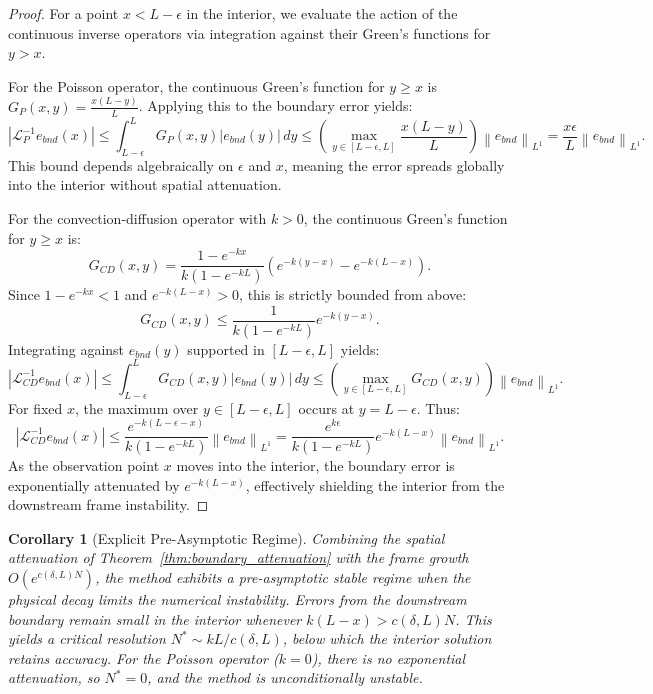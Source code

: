 \documentclass[pdflatex,sn-mathphys-num]{sn-jnl}%
\theoremstyle{thmstyleone}%
\newtheorem{corollary}{Corollary}
\newcommand{\norm}[1]{\left\lVert#1\right\rVert}
\begin{document}
\begin{proof}
For a point $x < L-\epsilon$ in the interior, we evaluate the action of the continuous inverse operators via integration against their Green's functions for $y > x$.

For the Poisson operator, the continuous Green's function for $y \ge x$ is $G_P(x,y) = \frac{x(L-y)}{L}$. Applying this to the boundary error yields:
\begin{equation} |\mathcal{L}_P^{-1} e_{bnd}(x)| \le \int_{L-\epsilon}^L G_P(x,y) |e_{bnd}(y)| \,dy \le \left(\max_{y \in [L-\epsilon, L]} \frac{x(L-y)}{L}\right) \norm{e_{bnd}}_{L^1} = \frac{x\epsilon}{L} \norm{e_{bnd}}_{L^1}. \end{equation}
This bound depends algebraically on $\epsilon$ and $x$, meaning the error spreads globally into the interior without spatial attenuation.

For the convection-diffusion operator with $k > 0$, the continuous Green's function for $y \ge x$ is:
\begin{equation} G_{CD}(x,y) = \frac{1 - e^{-kx}}{k(1 - e^{-kL})} \left( e^{-k(y-x)} - e^{-k(L-x)} \right). \end{equation}
Since $1 - e^{-kx} < 1$ and $e^{-k(L-x)} > 0$, this is strictly bounded from above:
\begin{equation} G_{CD}(x,y) \le \frac{1}{k(1 - e^{-kL})} e^{-k(y-x)}. \end{equation}
Integrating against $e_{bnd}(y)$ supported in $[L-\epsilon, L]$ yields:
\begin{equation} |\mathcal{L}_{CD}^{-1} e_{bnd}(x)| \le \int_{L-\epsilon}^L G_{CD}(x,y) |e_{bnd}(y)| \,dy \le \left( \max_{y \in [L-\epsilon, L]} G_{CD}(x,y) \right) \norm{e_{bnd}}_{L^1}. \end{equation}
For fixed $x$, the maximum over $y \in [L-\epsilon, L]$ occurs at $y = L-\epsilon$. Thus:
\begin{equation} |\mathcal{L}_{CD}^{-1} e_{bnd}(x)| \le \frac{e^{-k(L-\epsilon-x)}}{k(1 - e^{-kL})} \norm{e_{bnd}}_{L^1} = \frac{e^{k\epsilon}}{k(1 - e^{-kL})} e^{-k(L-x)} \norm{e_{bnd}}_{L^1}. \end{equation}
As the observation point $x$ moves into the interior, the boundary error is exponentially attenuated by $e^{-k(L-x)}$, effectively shielding the interior from the downstream frame instability.
\end{proof}

\begin{corollary}[Explicit Pre-Asymptotic Regime]
\label{cor:pre_asymptotic_threshold}
Combining the spatial attenuation of Theorem~\ref{thm:boundary_attenuation} with the frame growth $O(e^{c(\delta,L)N})$, the method exhibits a pre-asymptotic stable regime when the physical decay limits the numerical instability. Errors from the downstream boundary remain small in the interior whenever $k(L-x) > c(\delta, L) N$.
This yields a critical resolution $N^* \sim k L / c(\delta, L)$, below which the interior solution retains accuracy. For the Poisson operator ($k=0$), there is no exponential attenuation, so $N^* = 0$, and the method is unconditionally unstable.
\end{corollary}
\end{document}
